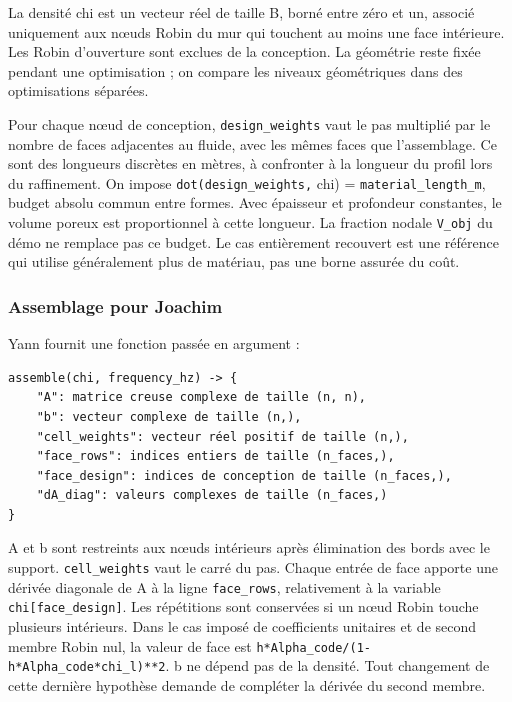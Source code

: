 \documentclass[11pt,a4paper]{article}
\begin{document}
La densité {\small\ttfamily chi} est un vecteur réel de taille B, borné entre zéro et un, associé uniquement aux nœuds Robin du mur qui touchent au moins une face intérieure. Les Robin d'ouverture sont exclues de la conception. La géométrie reste fixée pendant une optimisation ; on compare les niveaux géométriques dans des optimisations séparées.

Pour chaque nœud de conception, {\small\ttfamily \nolinkurl{design_weights}} vaut le pas multiplié par le nombre de faces adjacentes au fluide, avec les mêmes faces que l'assemblage. Ce sont des longueurs discrètes en mètres, à confronter à la longueur du profil lors du raffinement. On impose {\small\ttfamily \nolinkurl{dot(design_weights,} chi) = \nolinkurl{material_length_m}}, budget absolu commun entre formes. Avec épaisseur et profondeur constantes, le volume poreux est proportionnel à cette longueur. La fraction nodale {\small\ttfamily \nolinkurl{V_obj}} du démo ne remplace pas ce budget. Le cas entièrement recouvert est une référence qui utilise généralement plus de matériau, pas une borne assurée du coût.

\subsubsection{Assemblage pour Joachim}

Yann fournit une fonction passée en argument :

\begin{Verbatim}[breaklines,breakanywhere,fontsize=\footnotesize]
assemble(chi, frequency_hz) -> {
    "A": matrice creuse complexe de taille (n, n),
    "b": vecteur complexe de taille (n,),
    "cell_weights": vecteur réel positif de taille (n,),
    "face_rows": indices entiers de taille (n_faces,),
    "face_design": indices de conception de taille (n_faces,),
    "dA_diag": valeurs complexes de taille (n_faces,)
}
\end{Verbatim}

{\small\ttfamily A} et {\small\ttfamily b} sont restreints aux nœuds intérieurs après élimination des bords avec le support. {\small\ttfamily \nolinkurl{cell_weights}} vaut le carré du pas. Chaque entrée de face apporte une dérivée diagonale de {\small\ttfamily A} à la ligne {\small\ttfamily \nolinkurl{face_rows}}, relativement à la variable {\small\ttfamily \nolinkurl{chi[face_design]}}. Les répétitions sont conservées si un nœud Robin touche plusieurs intérieurs. Dans le cas imposé de coefficients unitaires et de second membre Robin nul, la valeur de face est {\small\ttfamily \nolinkurl{h*Alpha_code/(1-h*Alpha_code*chi_l)**2}}. {\small\ttfamily b} ne dépend pas de la densité. Tout changement de cette dernière hypothèse demande de compléter la dérivée du second membre.
\end{document}
